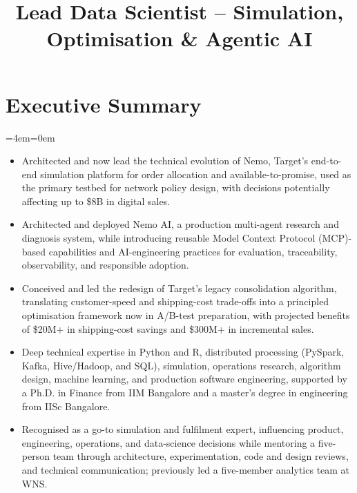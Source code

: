 \documentclass[11pt,a4paper]{moderncv}
\title{\Large Lead Data Scientist -- Simulation, Optimisation \& Agentic AI}
\begin{document}
\makecvtitle

\newenvironment{smallblockquote}{
  \par
  \medskip
  \leftskip=2em\rightskip=0em
  \noindent\ignorespaces
  }{\par\medskip}

\newenvironment{blockquote}{
  \par
  \medskip
  \leftskip=4em\rightskip=0em
  \noindent\ignorespaces
  }{\par\medskip}

\hypertarget{executive-summary}{
\section{Executive Summary}\label{executive-summary}}

\begingroup
  \par
  \medskip
  \leftskip=4em\rightskip=0em
  \noindent\ignorespaces

\begin{itemize}
    \item Architected and now lead the technical evolution of Nemo, Target's end-to-end simulation platform for order allocation and available-to-promise, used as the primary testbed for network policy design, with decisions potentially affecting up to \$8B in digital sales.
    \item Architected and deployed Nemo AI, a production multi-agent research and diagnosis system, while introducing reusable Model Context Protocol (MCP)-based capabilities and AI-engineering practices for evaluation, traceability, observability, and responsible adoption.
    \item Conceived and led the redesign of Target's legacy consolidation algorithm, translating customer-speed and shipping-cost trade-offs into a principled optimisation framework now in A/B-test preparation, with projected benefits of \$20M+ in shipping-cost savings and \$300M+ in incremental sales.
    \item Deep technical expertise in Python and R, distributed processing (PySpark, Kafka, Hive/Hadoop, and SQL), simulation, operations research, algorithm design, machine learning, and production software engineering, supported by a Ph.D. in Finance from IIM Bangalore and a master's degree in engineering from IISc Bangalore.
    \item Recognised as a go-to simulation and fulfilment expert, influencing product, engineering, operations, and data-science decisions while mentoring a five-person team through architecture, experimentation, code and design reviews, and technical communication; previously led a five-member analytics team at WNS.
\end{itemize}
\end{document}

